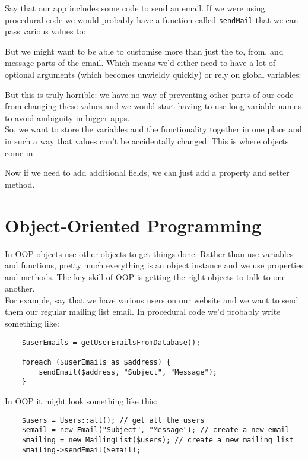 \pagebreak

Say that our app includes some code to send an email. If we were using procedural code we would probably have a function called \texttt{sendMail} that we can pass various values to:


But we might want to be able to customise more than just the to, from, and message parts of the email. Which means we'd either need to have a lot of optional arguments (which becomes unwieldy quickly) or rely on global variables:


But this is truly horrible: we have no way of preventing other parts of our code from changing these values and we would start having to use long variable names to avoid ambiguity in bigger apps.
\\

So, we want to store the variables and the functionality together in one place and in such a way that values can't be accidentally changed. This is where objects come in:


Now if we need to add additional fields, we can just add a property and setter method.


\section{Object-Oriented Programming}

In OOP objects use other objects to get things done. Rather than use variables and functions, pretty much everything is an object instance and we use properties and methods. The key skill of OOP is getting the right objects to talk to one another.
\\

For example, say that we have various users on our website and we want to send them our regular mailing list email. In procedural code we'd probably write something like:

\begin{verbatim}
    $userEmails = getUserEmailsFromDatabase();

    foreach ($userEmails as $address) {
        sendEmail($address, "Subject", "Message");
    }
\end{verbatim}

In OOP it might look something like this:

\begin{verbatim}
    $users = Users::all(); // get all the users
    $email = new Email("Subject", "Message"); // create a new email
    $mailing = new MailingList($users); // create a new mailing list
    $mailing->sendEmail($email);
\end{verbatim}

